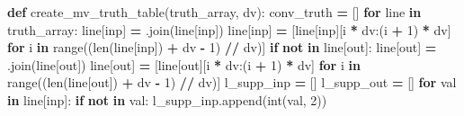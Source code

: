 \documentclass[
]{book}
\newenvironment{Shaded}{\begin{snugshade}}{\end{snugshade}}
\newcommand{\BuiltInTok}[1]{#1}
\newcommand{\ControlFlowTok}[1]{\textcolor[rgb]{0.13,0.29,0.53}{\textbf{#1}}}
\newcommand{\DecValTok}[1]{\textcolor[rgb]{0.00,0.00,0.81}{#1}}
\newcommand{\KeywordTok}[1]{\textcolor[rgb]{0.13,0.29,0.53}{\textbf{#1}}}
\newcommand{\NormalTok}[1]{#1}
\newcommand{\OperatorTok}[1]{\textcolor[rgb]{0.81,0.36,0.00}{\textbf{#1}}}
\newcommand{\StringTok}[1]{\textcolor[rgb]{0.31,0.60,0.02}{#1}}
\begin{document}
\begin{Shaded}
\begin{Highlighting}[]
\KeywordTok{def}\NormalTok{ create\_mv\_truth\_table(truth\_array, dv):}
\NormalTok{  conv\_truth }\OperatorTok{=}\NormalTok{ []}
  \ControlFlowTok{for}\NormalTok{ line }\KeywordTok{in}\NormalTok{ truth\_array:}
\NormalTok{    line[}\StringTok{\textquotesingle{}inp\textquotesingle{}}\NormalTok{] }\OperatorTok{=} \StringTok{\textquotesingle{}\textquotesingle{}}\NormalTok{.join(line[}\StringTok{\textquotesingle{}inp\textquotesingle{}}\NormalTok{])}
\NormalTok{    line[}\StringTok{\textquotesingle{}inp\textquotesingle{}}\NormalTok{] }\OperatorTok{=}\NormalTok{ [line[}\StringTok{\textquotesingle{}inp\textquotesingle{}}\NormalTok{][i }\OperatorTok{*}\NormalTok{ dv:(i }\OperatorTok{+} \DecValTok{1}\NormalTok{) }\OperatorTok{*}\NormalTok{ dv]}
      \ControlFlowTok{for}\NormalTok{ i }\KeywordTok{in} \BuiltInTok{range}\NormalTok{((}\BuiltInTok{len}\NormalTok{(line[}\StringTok{\textquotesingle{}inp\textquotesingle{}}\NormalTok{]) }\OperatorTok{+}\NormalTok{ dv }\OperatorTok{{-}} \DecValTok{1}\NormalTok{) }\OperatorTok{//}\NormalTok{ dv)]}
    \ControlFlowTok{if} \StringTok{\textquotesingle{}{-}\textquotesingle{}} \KeywordTok{not} \KeywordTok{in}\NormalTok{ line[}\StringTok{\textquotesingle{}out\textquotesingle{}}\NormalTok{]:}
\NormalTok{      line[}\StringTok{\textquotesingle{}out\textquotesingle{}}\NormalTok{] }\OperatorTok{=} \StringTok{\textquotesingle{}\textquotesingle{}}\NormalTok{.join(line[}\StringTok{\textquotesingle{}out\textquotesingle{}}\NormalTok{])}
\NormalTok{      line[}\StringTok{\textquotesingle{}out\textquotesingle{}}\NormalTok{] }\OperatorTok{=}\NormalTok{ [line[}\StringTok{\textquotesingle{}out\textquotesingle{}}\NormalTok{][i }\OperatorTok{*}\NormalTok{ dv:(i }\OperatorTok{+} \DecValTok{1}\NormalTok{) }\OperatorTok{*}\NormalTok{ dv]}
        \ControlFlowTok{for}\NormalTok{ i }\KeywordTok{in} \BuiltInTok{range}\NormalTok{((}\BuiltInTok{len}\NormalTok{(line[}\StringTok{\textquotesingle{}out\textquotesingle{}}\NormalTok{]) }\OperatorTok{+}\NormalTok{ dv }\OperatorTok{{-}} \DecValTok{1}\NormalTok{) }\OperatorTok{//}\NormalTok{ dv)]}
\NormalTok{      l\_supp\_inp }\OperatorTok{=}\NormalTok{ []}
\NormalTok{      l\_supp\_out }\OperatorTok{=}\NormalTok{ []}
      \ControlFlowTok{for}\NormalTok{ val }\KeywordTok{in}\NormalTok{ line[}\StringTok{\textquotesingle{}inp\textquotesingle{}}\NormalTok{]:}
        \ControlFlowTok{if} \StringTok{\textquotesingle{}{-}\textquotesingle{}} \KeywordTok{not} \KeywordTok{in}\NormalTok{ val:}
\NormalTok{          l\_supp\_inp.append(}\BuiltInTok{int}\NormalTok{(val, }\DecValTok{2}\NormalTok{))}

\end{Highlighting}
\end{Shaded}
\end{document}
